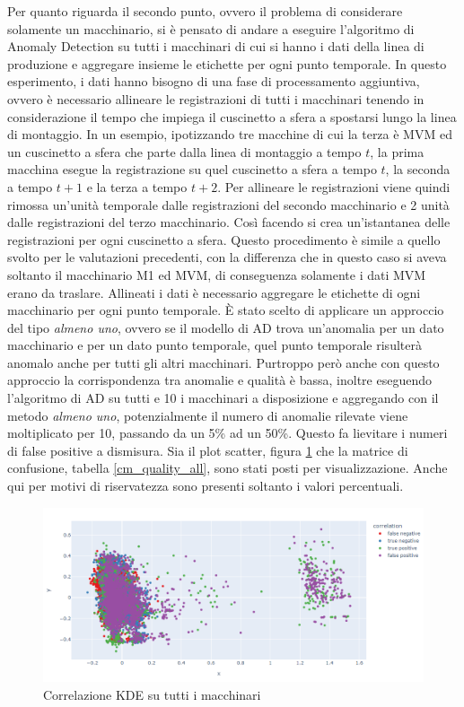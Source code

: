 Per quanto riguarda il secondo punto, ovvero il problema di considerare solamente un macchinario, si è pensato di andare a eseguire l'algoritmo di Anomaly Detection su tutti i macchinari di cui si hanno i dati della linea di produzione e aggregare insieme le etichette per ogni punto temporale.
In questo esperimento, i dati hanno bisogno di una fase di processamento aggiuntiva, ovvero è necessario allineare le registrazioni di tutti i macchinari tenendo in considerazione il tempo che impiega il cuscinetto a sfera a spostarsi lungo la linea di montaggio. In un esempio, ipotizzando tre macchine di cui la terza è MVM ed un cuscinetto a sfera che parte dalla linea di montaggio a tempo $t$, la prima macchina esegue la registrazione su quel cuscinetto a sfera a tempo $t$, la seconda a tempo $t+1$ e la terza a tempo $t+2$. Per allineare le registrazioni viene quindi rimossa un'unità temporale dalle registrazioni del secondo macchinario e 2 unità dalle registrazioni del terzo macchinario. Così facendo si crea un'istantanea delle registrazioni per ogni cuscinetto a sfera. Questo procedimento è simile a quello svolto per le valutazioni precedenti, con la differenza che in questo caso si aveva soltanto il macchinario M1 ed MVM, di conseguenza solamente i dati MVM erano da traslare.
Allineati i dati è necessario aggregare le etichette di ogni macchinario per ogni punto temporale. È stato scelto di applicare un approccio del tipo \textit{almeno uno}, ovvero se il modello di AD trova un'anomalia per un dato macchinario e per un dato punto temporale, quel punto temporale risulterà anomalo anche per tutti gli altri macchinari. 
Purtroppo però anche con questo approccio la corrispondenza tra anomalie e qualità è bassa, inoltre eseguendo l'algoritmo di AD su tutti e 10 i macchinari a disposizione e aggregando con il metodo \textit{almeno uno}, potenzialmente il numero di anomalie rilevate viene moltiplicato per 10, passando da un 5\% ad un 50\%. Questo fa lievitare i numeri di false positive a dismisura. Sia il plot scatter, figura \ref{quality_all_machines} che la matrice di confusione, tabella \ref{cm_quality_all}, sono stati posti per visualizzazione. Anche qui per motivi di riservatezza sono presenti soltanto i valori percentuali.

\begin{figure}[t]
	\centering
	\includegraphics[width=14cm, scale=1]{images/correlation_all_quality_plot.png}
	\caption{Correlazione KDE su tutti i macchinari}
	\label{quality_all_machines}
\end{figure}

